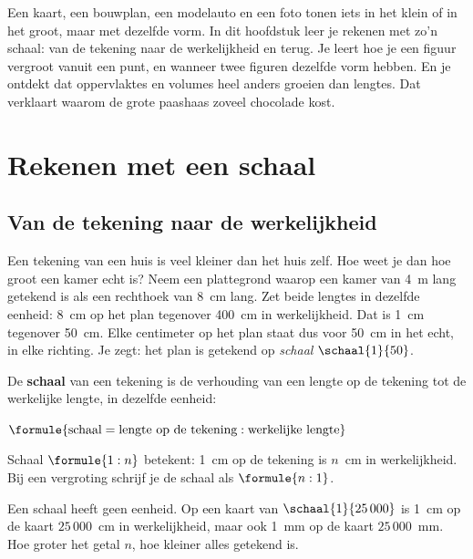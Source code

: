 Een kaart, een bouwplan, een modelauto en een foto tonen iets in het klein of in het groot, maar met dezelfde vorm. In dit hoofdstuk leer je rekenen met zo'n schaal: van de tekening naar de werkelijkheid en terug. Je leert hoe je een figuur vergroot vanuit een punt, en wanneer twee figuren dezelfde vorm hebben. En je ontdekt dat oppervlaktes en volumes heel anders groeien dan lengtes. Dat verklaart waarom de grote paashaas zoveel chocolade kost.

\begin{oefeningen}[Start]

\end{oefeningen}

\section{Rekenen met een schaal}

\subsection{Van de tekening naar de werkelijkheid}

Een tekening van een huis is veel kleiner dan het huis zelf. Hoe weet je dan hoe groot een kamer echt is? Neem een plattegrond waarop een kamer van 4~m lang getekend is als een rechthoek van 8~cm lang. Zet beide lengtes in dezelfde eenheid: 8~cm op het plan tegenover 400~cm in werkelijkheid. Dat is 1~cm tegenover 50~cm. Elke centimeter op het plan staat dus voor 50~cm in het echt, in elke richting. Je zegt: het plan is getekend op \emph{schaal} $\schaal{1}{50}$.

\begin{theorie}
De \textbf{\textcolor{accent}{schaal}} van een tekening is de verhouding van een lengte op de tekening tot de werkelijke lengte, in dezelfde eenheid:

\vspace{1mm}
\qquad $\formule{\text{schaal} = \text{lengte op de tekening} : \text{werkelijke lengte}}$

\vspace{1mm}
Schaal $\formule{1 : n}$ betekent: 1~cm op de tekening is $n$~cm in werkelijkheid. Bij een vergroting schrijf je de schaal als $\formule{n : 1}$.
\end{theorie}

Een schaal heeft geen eenheid. Op een kaart van $\schaal{1}{25\,000}$ is 1~cm op de kaart $25\,000$~cm in werkelijkheid, maar ook 1~mm op de kaart $25\,000$~mm. Hoe groter het getal $n$, hoe kleiner alles getekend is.

